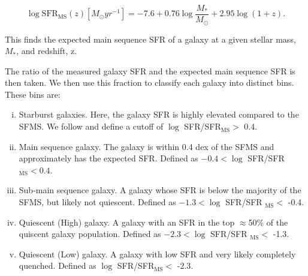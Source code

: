 \begin{equation}
\log \text{SFR}_{\text{MS}}(z)[M_\odot yr^{-1}] = -7.6 + 0.76\log\frac{M_*}{M_\odot} + 2.95\log(1+z).
\end{equation}

\noindent This finds the expected main sequence SFR of a galaxy at a given stellar mass, $M_*$, and redshift, z.

The ratio of the measured galaxy SFR and the expected main sequence SFR is then taken. We then use this fraction to classify each galaxy into distinct bins. These bins are:

\begin{enumerate}[(i)]
\item Starburst galaxies. Here, the galaxy SFR is highly elevated compared to the SFMS. We follow \citet{2019MNRAS.484.4360A} and define a cutoff of $\log$ SFR/SFR$_{\text{MS}} >$ 0.4.
\item Main sequence galaxy. The galaxy is within 0.4 dex of the SFMS and approximately has the expected SFR. Defined as $-0.4 < \log$ SFR/SFR$_{\text{MS}} < 0.4$.
\item Sub-main sequence galaxy. A galaxy whose SFR is below the majority of the SFMS, but likely not quiescent. Defined as $-1.3 < \log$ SFR/SFR $_{\text{MS}} < $ -0.4.
\item Quiescent (High) galaxy. A galaxy with an SFR in the top $\approx$50\% of the quiscent galaxy population. Defined as $-2.3 < \log$ SFR/SFR $_{\text{MS}} <$ -1.3.
\item Quiescent (Low) galaxy. A galaxy with low SFR and very likely completely quenched. Defined as $\log$ SFR/SFR$_{\text{MS}} <$ -2.3.
\end{enumerate}

